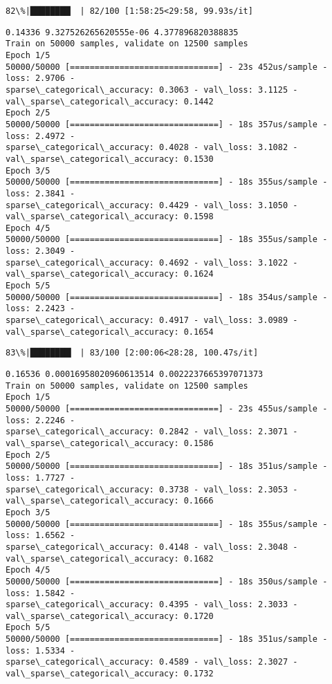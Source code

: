 \documentclass[11pt]{article}
\begin{document}
    \begin{Verbatim}[commandchars=\\\{\}]
 82\%|████████▏ | 82/100 [1:58:25<29:58, 99.93s/it]
    \end{Verbatim}

    \begin{Verbatim}[commandchars=\\\{\}]
0.14336 9.327526265620555e-06 4.377896820388835
Train on 50000 samples, validate on 12500 samples
Epoch 1/5
50000/50000 [==============================] - 23s 452us/sample - loss: 2.9706 -
sparse\_categorical\_accuracy: 0.3063 - val\_loss: 3.1125 -
val\_sparse\_categorical\_accuracy: 0.1442
Epoch 2/5
50000/50000 [==============================] - 18s 357us/sample - loss: 2.4972 -
sparse\_categorical\_accuracy: 0.4028 - val\_loss: 3.1082 -
val\_sparse\_categorical\_accuracy: 0.1530
Epoch 3/5
50000/50000 [==============================] - 18s 355us/sample - loss: 2.3841 -
sparse\_categorical\_accuracy: 0.4429 - val\_loss: 3.1050 -
val\_sparse\_categorical\_accuracy: 0.1598
Epoch 4/5
50000/50000 [==============================] - 18s 355us/sample - loss: 2.3049 -
sparse\_categorical\_accuracy: 0.4692 - val\_loss: 3.1022 -
val\_sparse\_categorical\_accuracy: 0.1624
Epoch 5/5
50000/50000 [==============================] - 18s 354us/sample - loss: 2.2423 -
sparse\_categorical\_accuracy: 0.4917 - val\_loss: 3.0989 -
val\_sparse\_categorical\_accuracy: 0.1654
    \end{Verbatim}

    \begin{Verbatim}[commandchars=\\\{\}]
 83\%|████████▎ | 83/100 [2:00:06<28:28, 100.47s/it]
    \end{Verbatim}

    \begin{Verbatim}[commandchars=\\\{\}]
0.16536 0.00016958020960613514 0.0022237665397071373
Train on 50000 samples, validate on 12500 samples
Epoch 1/5
50000/50000 [==============================] - 23s 455us/sample - loss: 2.2246 -
sparse\_categorical\_accuracy: 0.2842 - val\_loss: 2.3071 -
val\_sparse\_categorical\_accuracy: 0.1586
Epoch 2/5
50000/50000 [==============================] - 18s 351us/sample - loss: 1.7727 -
sparse\_categorical\_accuracy: 0.3738 - val\_loss: 2.3053 -
val\_sparse\_categorical\_accuracy: 0.1666
Epoch 3/5
50000/50000 [==============================] - 18s 355us/sample - loss: 1.6562 -
sparse\_categorical\_accuracy: 0.4148 - val\_loss: 2.3048 -
val\_sparse\_categorical\_accuracy: 0.1682
Epoch 4/5
50000/50000 [==============================] - 18s 350us/sample - loss: 1.5842 -
sparse\_categorical\_accuracy: 0.4395 - val\_loss: 2.3033 -
val\_sparse\_categorical\_accuracy: 0.1720
Epoch 5/5
50000/50000 [==============================] - 18s 351us/sample - loss: 1.5334 -
sparse\_categorical\_accuracy: 0.4589 - val\_loss: 2.3027 -
val\_sparse\_categorical\_accuracy: 0.1732
    \end{Verbatim}
\end{document}
